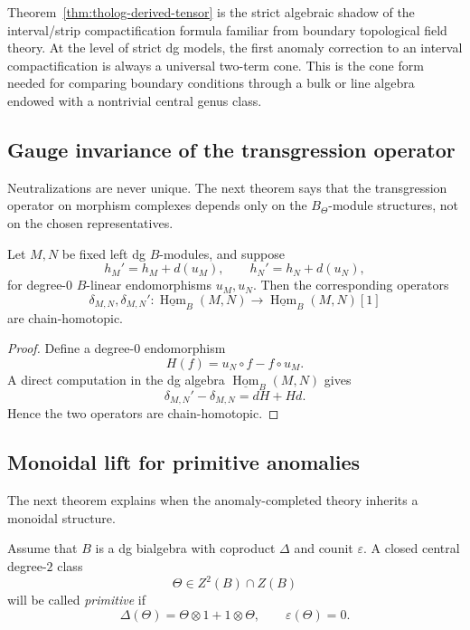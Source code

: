 \begin{remark}
\label{rem:tholog-interval-compactification}
Theorem~\ref{thm:tholog-derived-tensor} is the strict algebraic shadow of the interval/strip compactification formula familiar from boundary topological field theory.
At the level of strict dg models, the first anomaly correction to an interval compactification is always a universal two-term cone.
This is the cone form needed for comparing boundary conditions through a bulk or line algebra endowed with a nontrivial central genus class.
\end{remark}

\subsection{Gauge invariance of the transgression operator}
\label{subsec:tholog-gauge-invariance}

Neutralizations are never unique.
The next theorem says that the transgression operator on morphism complexes depends only on the \(B_{\Theta}\)-module structures, not on the chosen representatives.

\begin{theorem}
\label{thm:tholog-gauge-invariance}
Let \(M,N\) be fixed left dg \(B\)-modules, and suppose
\[
h_{M}'=h_{M}+d(u_{M}),
\qquad
h_{N}'=h_{N}+d(u_{N}),
\]
for degree-\(0\) \(B\)-linear endomorphisms \(u_{M},u_{N}\).
Then the corresponding operators
\[
\delta_{M,N},\delta_{M,N}' :
\underline{\operatorname{Hom}}_{B}(M,N)\to
\underline{\operatorname{Hom}}_{B}(M,N)[1]
\]
are chain-homotopic.
\end{theorem}

\begin{proof}
Define a degree-\(0\) endomorphism
\[
H(f)=u_{N}\circ f-f\circ u_{M}.
\]
A direct computation in the dg algebra \(\underline{\operatorname{Hom}}_{B}(M,N)\) gives
\[
\delta_{M,N}'-\delta_{M,N}=dH+Hd.
\]
Hence the two operators are chain-homotopic.
\end{proof}

\subsection{Monoidal lift for primitive anomalies}
\label{subsec:tholog-monoidal-lift}

The next theorem explains when the anomaly-completed theory inherits a monoidal structure.

\begin{definition}
\label{def:tholog-primitive-anomaly}
Assume that \(B\) is a dg bialgebra with coproduct \(\Delta\) and counit \(\varepsilon\).
A closed central degree-\(2\) class
\[
\Theta\in Z^{2}(B)\cap Z(B)
\]
will be called \emph{primitive} if
\[
\Delta(\Theta)=\Theta\otimes 1+1\otimes \Theta,
\qquad
\varepsilon(\Theta)=0.
\]
\end{definition}

